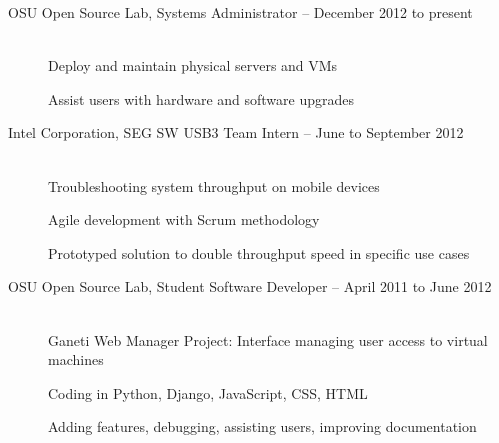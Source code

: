 \documentclass[11pt]{article}
\begin{document}
\hrulefill
\smallskip

\begin{description}
\item[OSU Open Source Lab, Systems Administrator -- December 2012 to present]
    \hfill \\
    Deploy and maintain physical servers and VMs

    Assist users with hardware and software upgrades

\item[Intel Corporation, SEG SW USB3 Team Intern -- June to September
2012]
    \hfill \\
    Troubleshooting system throughput on mobile devices

    Agile development with Scrum methodology

    Prototyped solution to double throughput speed in specific use cases

\item[OSU Open Source Lab, Student Software Developer -- April 2011 to June
2012]
    \hfill \\
    Ganeti Web Manager Project: Interface managing user access to
    virtual machines

    Coding in Python, Django, JavaScript, CSS, HTML

    Adding features, debugging, assisting users, improving documentation

\end{description}
\end{document}
